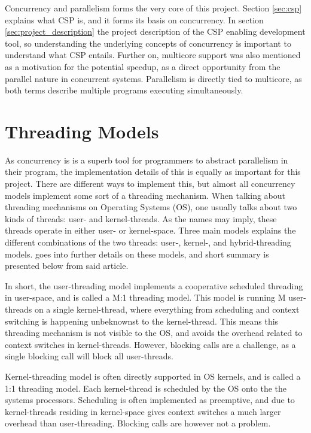 Concurrency and parallelism forms the very core of this project. Section \ref{sec:csp} explains what CSP is, and it forms its basis on concurrency. In section \ref{sec:project_description} the project description of the CSP enabling development tool, so understanding the underlying concepts of concurrency is important to understand what CSP entails. Further on, multicore support was also mentioned as a motivation for the potential speedup, as a direct opportunity from the parallel nature in concurrent systems. Parallelism is directly tied to multicore, as both terms describe multiple programs executing simultaneously. 


\section{Threading Models}
\label{sec:threadingmodels}

As concurrency is is a superb tool for programmers to abstract parallelism in their program, the implementation details of this is equally as important for this project. There are different ways to implement this, but almost all concurrency models implement some sort of a threading mechanism. When talking about threading mechanisms on Operating Systems (OS), one usually talks about two kinds of threads: user- and kernel-threads. As the names may imply, these threads operate in either user- or kernel-space. Three main models explains the different combinations of the two threads: user-, kernel-, and hybrid-threading models. \citet{brown2007} goes into further details on these models, and short summary is presented below from said article.

In short, the user-threading model implements a cooperative scheduled threading in user-space, and is called a M:1 threading model. This model is running M user-threads on a single kernel-thread, where everything from scheduling and context switching is happening unbeknownst to the kernel-thread. This means this threading mechanism is not visible to the OS, and avoids the overhead related to context switches in kernel-threads. However, blocking calls are a challenge, as a single blocking call will block all user-threads.

Kernel-threading model is often directly supported in OS kernels, and is called a 1:1 threading model. Each kernel-thread is scheduled by the OS onto the the systems processors. Scheduling is often implemented as preemptive, and due to kernel-threads residing in kernel-space gives context switches a much larger overhead than user-threading. Blocking calls are however not a problem. 

